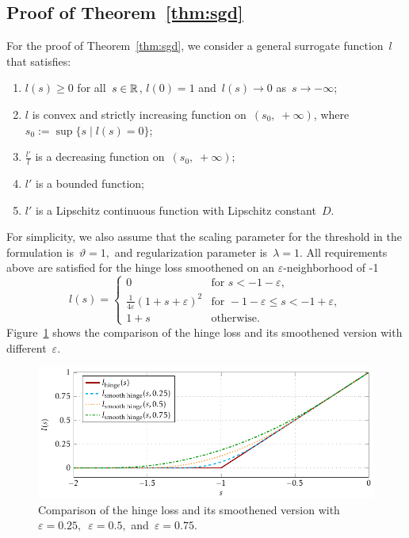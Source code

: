 \subsection{Proof of Theorem~\ref{thm:sgd}}\label{app:sgd2}

For the proof of Theorem~\ref{thm:sgd}, we consider a general surrogate function~$l$ that satisfies:
\begin{enumerate}[label={(\textbf{S\arabic*})}, left = 15pt]
  \item \label{surr_basic1} $l(s)\geq 0$ for all~$s\in\mathbb{R}$, $l(0)=1$ and~$l(s)\to 0$ as~$s\to-\infty$;
  \item \label{surr_basic2} $l$ is convex and strictly increasing function on~$(s_0,\; +\infty)$, where~$s_0:=\sup\{s \mid l(s)=0\}$;
  \item \label{surr_ratio} $\frac{l'}{l}$ is a decreasing function on~$(s_0, \; +\infty)$;
  \item \label{surr_der1} $l'$ is a bounded function;
  \item \label{surr_der2} $l'$ is a Lipschitz continuous function with Lipschitz constant~$D$.
\end{enumerate}
For simplicity, we also assume that the scaling parameter for the threshold in the \PatMat formulation is~$\vartheta = 1,$ and regularization parameter is~$\lambda = 1.$ All requirements above are satisfied for the hinge loss smoothened on an $\varepsilon$-neighborhood of -1
\begin{equation*}
  l(s) = \begin{cases}
    0 & \text{for } s < -1 - \varepsilon, \\
    \frac{1}{4\varepsilon}(1 + s + \varepsilon)^2 & \text{for } - 1 - \varepsilon \leq s < - 1 + \varepsilon, \\
    1 + s & \text{otherwise.}
  \end{cases}
\end{equation*}
Figure~\ref{fig: surrogates smooth} shows the comparison of the hinge loss and its smoothened version with different~$\varepsilon.$

\begin{figure}[t]
  \centering
  \includegraphics[width = \linewidth]{images/surrogates_smooth.pdf}
  \caption{Comparison of the hinge loss and its smoothened version with~$\varepsilon = 0.25,$~$\varepsilon = 0.5,$ and~$\varepsilon = 0.75.$}
  \label{fig: surrogates smooth}
\end{figure}


